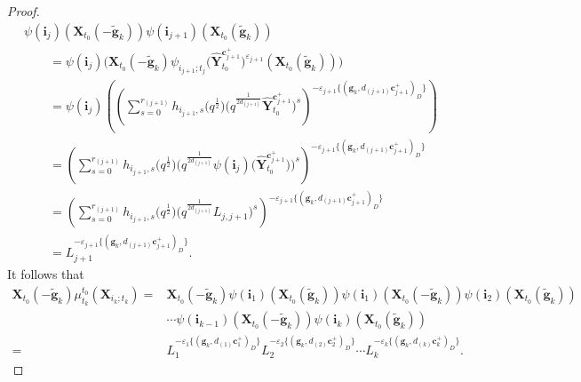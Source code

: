 \documentclass[pdftex]{sigma}
\numberwithin{equation}{section}
\begin{document}
\begin{proof}
\begin{gather*}
  \psi(\mathbf{i}_{j})(\mathbf{X}_{t_{0}}(-\mathbf{\tilde{g}}_{k}))\psi(\mathbf{i}_{j+1})(\mathbf{X}_{t_{0}}(\mathbf{\tilde{g}}_{k}))\\
  \qquad=\psi(\mathbf{i}_{j})\bigl(\mathbf{X}_{t_{0}}(-\mathbf{\tilde{g}}_{k})\psi_{i_{j+1};t_{j}}\bigl(\mathbf{\hat{Y}}_{t_0}^{\mathbf{c}_{j+1}^+}\bigr)^{\varepsilon_{j+1}}
  (\mathbf{X}_{t_{0}}(\mathbf{\tilde{g}}_{k}))\bigr)\\
 \qquad  =\psi(\mathbf{i}_{j})\left(\left(\sum\limits^{r_{(j+1)}}_{s=0}h_{i_{j+1},s}\bigl(q^{\frac{1}{2}}\bigr)
 \bigl(q^{\frac{1}{2d_{(j+1)}}}\mathbf{\hat{Y}}_{t_{0}}^{\mathbf{c}_{j+1}^{+}}\bigr)^{s}\right)
 ^{-\varepsilon_{j+1}\{(\mathbf{g}_{k},d_{(j+1)}\mathbf{c}_{j+1}^{+})_{D}\}}\right)\\
\qquad  =\left(\sum\limits^{r_{(j+1)}}_{s=0}h_{i_{j+1},s}\bigl(q^{\frac{1}{2}}\bigr)\bigl(q^{\frac{1}{2d_{(j+1)}}}\psi(\mathbf{i}_{j})\bigl(\mathbf{\hat{Y}}_{t_{0}}^{\mathbf{c}_{j+1}^{+}}\bigr)\bigr)^{s}\right)^{-\varepsilon_{j+1}\{(\mathbf{g}_{k},d_{(j+1)}\mathbf{c}_{j+1}^{+})_{D}\}}\\
\qquad  =\left(\sum\limits^{r_{(j+1)}}_{s=0}h_{i_{j+1},s}\bigl(q^{\frac{1}{2}}\bigr)\bigl(q^{\frac{1}{2d_{(j+1)}}}L_{j,j+1}\bigr)^{s}\right)^{-\varepsilon_{j+1}\{(\mathbf{g}_{k},d_{(j+1)}\mathbf{c}_{j+1}^{+})_{D}\}}\\
\qquad  =L_{j+1}^{-\varepsilon_{j+1}\{(\mathbf{g}_{k},d_{(j+1)}\mathbf{c}_{j+1}^{+})_{D}\}}.
 \end{gather*}
 It follows that
 \begin{align*}
 \mathbf{X}_{t_{0}}(-\mathbf{\tilde{g}}_{k})\mu_{t_{k}}^{t_{0}}(\mathbf{X}_{i_{k};t_{k}})
 ={}&\mathbf{X}_{t_{0}}(-\mathbf{\tilde{g}}_{k})\psi(\mathbf{i}_{1})(\mathbf{X}_{t_{0}}(\mathbf{\tilde{g}}_{k}))\psi(\mathbf{i}_{1})(\mathbf{X}_{t_{0}}(-\mathbf{\tilde{g}}_{k}))\psi(\mathbf{i}_{2})(\mathbf{X}_{t_{0}}(\mathbf{\tilde{g}}_{k}))\\
 &\cdots\psi(\mathbf{i}_{k-1})(\mathbf{X}_{t_{0}}(-\mathbf{\tilde{g}}_{k}))\psi(\mathbf{i}_{k})(\mathbf{X}_{t_{0}}(\mathbf{\tilde{g}}_{k}))\\
 ={}&L_{1}^{-\varepsilon_{1}\{(\mathbf{g}_{k},d_{(1)}\mathbf{c}_{1}^{+})_{D}\}}L_{2}^{-\varepsilon_{2}\{(\mathbf{g}_{k},d_{(2)}\mathbf{c}_{2}^{+})_{D}\}}\cdots L_{k}^{-\varepsilon_{k}\{(\mathbf{g}_{k},d_{(k)}\mathbf{c}_{k}^{+})_{D}\}}.\tag*{\qed}
 \end{align*}\renewcommand{\qed}{}
\end{proof}
\end{document}
